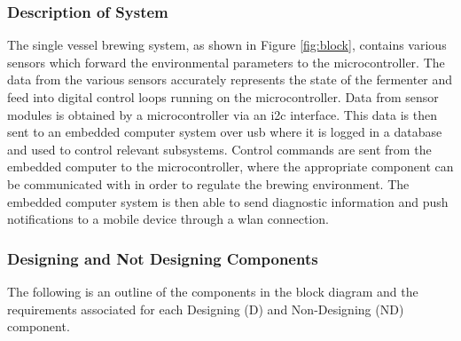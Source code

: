\documentclass{article}
\begin{document}
\subsubsection{Description of System}
The single vessel brewing system, as shown in Figure \ref{fig:block}, contains various sensors which forward the environmental parameters to the microcontroller. The data from the various sensors accurately represents the state of the fermenter and feed into digital control loops running on the microcontroller.  Data from sensor modules is obtained by a microcontroller via an \gls{i2c} interface. This data is then sent to an embedded computer system over \gls{usb} where it is logged in a database and used to control relevant subsystems. Control commands are sent from the embedded computer to the microcontroller, where the appropriate component can be communicated with in order to regulate the brewing environment.  The embedded computer system is then able to send diagnostic information and push notifications to a mobile device through a \gls{wlan} connection.

\subsubsection{Designing and Not Designing Components}
The following is an outline of the components in the block diagram and the requirements associated for each Designing (D) and Non-Designing (ND) component.
\end{document}
